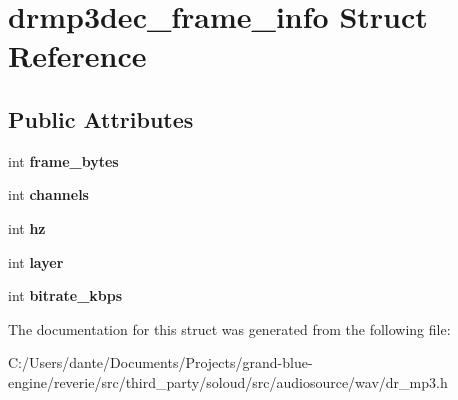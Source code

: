 \hypertarget{structdrmp3dec__frame__info}{}\section{drmp3dec\+\_\+frame\+\_\+info Struct Reference}
\label{structdrmp3dec__frame__info}
\subsection*{Public Attributes}
\begin{DoxyCompactItemize}
\item 
\mbox{\label{structdrmp3dec__frame__info_a723116fb9098d6299bb6b39082d5d46f}} 
int {\bfseries frame\+\_\+bytes}
\item 
\mbox{\label{structdrmp3dec__frame__info_a3ac661a8ab7ea40df55a07d4c4d8646c}} 
int {\bfseries channels}
\item 
\mbox{\label{structdrmp3dec__frame__info_abe77517f4ee3765ba556faa60ea1cb05}} 
int {\bfseries hz}
\item 
\mbox{\label{structdrmp3dec__frame__info_a91703350261bae1eb34df2e6a6e7661e}} 
int {\bfseries layer}
\item 
\mbox{\label{structdrmp3dec__frame__info_ac8b0b572f5d049f8520abdd0ca0f9c49}} 
int {\bfseries bitrate\+\_\+kbps}
\end{DoxyCompactItemize}


The documentation for this struct was generated from the following file\+:\begin{DoxyCompactItemize}
\item 
C\+:/\+Users/dante/\+Documents/\+Projects/grand-\/blue-\/engine/reverie/src/third\+\_\+party/soloud/src/audiosource/wav/dr\+\_\+mp3.\+h\end{DoxyCompactItemize}
